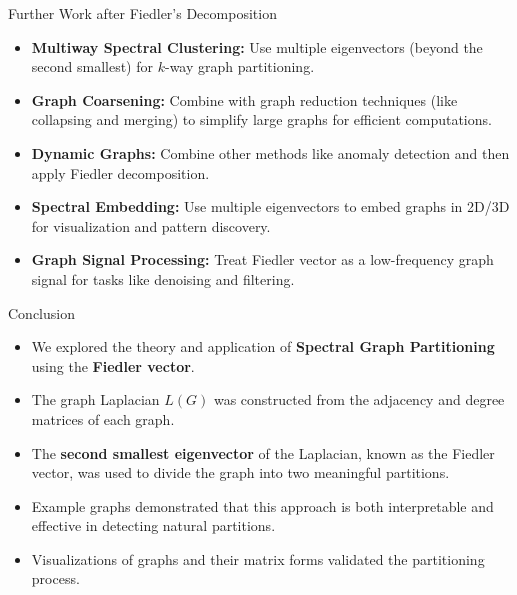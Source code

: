 \documentclass[aspectratio=169]{beamer}
\begin{document}
\begin{frame}{Further Work after Fiedler's Decomposition}
\begin{itemize}
    \item \textbf{Multiway Spectral Clustering:} Use multiple eigenvectors (beyond the second smallest) for \( k \)-way graph partitioning.
    \item \textbf{Graph Coarsening:} Combine with graph reduction techniques (like collapsing and merging) to simplify large graphs for efficient computations.
    \item \textbf{Dynamic Graphs:} Combine other methods like anomaly detection and then apply Fiedler decomposition.
    \item \textbf{Spectral Embedding:} Use multiple eigenvectors to embed graphs in 2D/3D for visualization and pattern discovery.
    \item \textbf{Graph Signal Processing:} Treat Fiedler vector as a low-frequency graph signal for tasks like denoising and filtering.
\end{itemize}
\end{frame}


\begin{frame}{Conclusion}
    \begin{itemize}
        \item We explored the theory and application of \textbf{Spectral Graph Partitioning} using the \textbf{Fiedler vector}.
        \item The graph Laplacian \( L(G) \) was constructed from the adjacency and degree matrices of each graph.
        \item The \textbf{second smallest eigenvector} of the Laplacian, known as the Fiedler vector, was used to divide the graph into two meaningful partitions.
        \item Example graphs demonstrated that this approach is both interpretable and effective in detecting natural partitions.
        \item Visualizations of graphs and their matrix forms validated the partitioning process.
    \end{itemize}
\end{frame}
\end{document}
